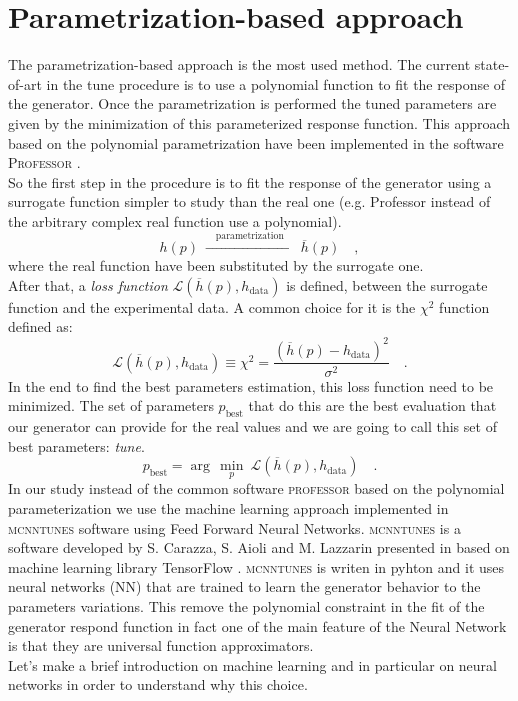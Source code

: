 \section{Parametrization-based approach}

The parametrization-based approach is the most used method. The current state-of-art in the tune procedure is to use a polynomial function to fit the response of the generator. Once the parametrization is performed the tuned parameters are given by the minimization of this parameterized response function. This approach based on the polynomial parametrization have been  implemented in the software \textsc{Professor} \cite{Buckley:2009bj}. 
\\
So the first step in the procedure is to fit the response of the generator using a surrogate function simpler to study than the real one (e.g. Professor instead of the arbitrary complex real function use a polynomial).
\begin{equation}
	h(p)\ \xrightarrow{\quad \text{parametrization}\quad }\ \overline{h}(p)\quad ,
\end{equation}
where the real function have been substituted by the surrogate one. 
\\
After that, a \textit{loss function} $\mathcal{L}(\overline{h}(p),h_{\text{data}})$ is defined, between the surrogate function and the experimental data. A common choice for it is the $\chi^2$ function defined as:
\begin{equation}
	\mathcal{L}(\overline{h}(p),h_{\text{data}})\equiv \chi^2=\frac{(\overline{h}(p)-h_{\text{data}})^2}{\sigma^2}\quad.
\end{equation}
In the end to find the best parameters estimation, this loss function need to be minimized. The set of parameters $p_{\text{best}}$ that do this are the best evaluation that our generator can provide for the real values and we are going to call this set of best parameters: \textit{tune}.
\begin{equation}
	p_{\text{best}}=\arg\,\min_p\ \mathcal{L}(\overline{h}(p),h_{\text{data}})\quad.
\end{equation}
In our study instead of the common software \textsc{professor} based on the polynomial parameterization we use the machine learning approach implemented in \textsc{mcnntunes} software \cite{MCNNTUNESonGitHub}
using Feed Forward Neural Networks. \textsc{mcnntunes} is a software developed by S. Carazza, S. Aioli and M. Lazzarin presented in \cite{MCNNTUNESarticle} based on machine learning library TensorFlow \cite{tensorflow2015-whitepaper}. \textsc{mcnntunes} is writen in pyhton and it uses neural networks (NN) that are trained to learn the generator behavior to the parameters variations. This remove the polynomial constraint in the fit of the generator respond function in fact one of the main feature of the Neural Network is that they are universal function approximators.
\\
Let's make a brief introduction on machine learning and in particular on neural networks in order to understand why this choice.

